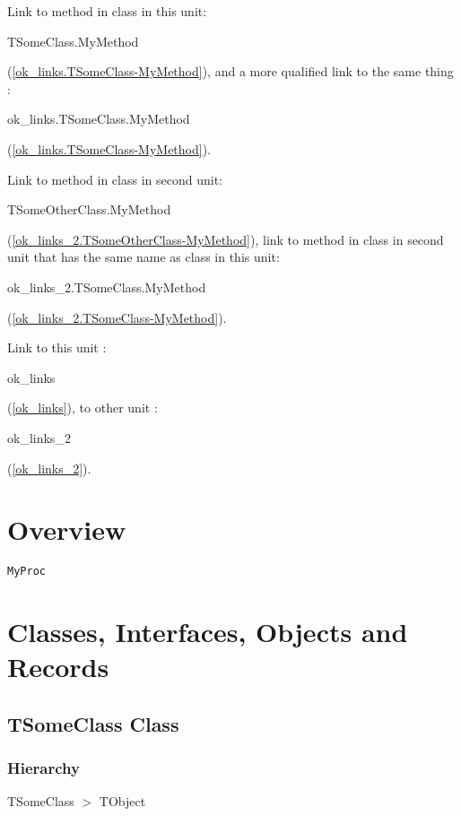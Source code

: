 \documentclass{report}
\begin{document}
Link to method in class in this unit: \begin{ttfamily}TSomeClass.MyMethod\end{ttfamily}(\ref{ok_links.TSomeClass-MyMethod}), and a more qualified link to the same thing : \begin{ttfamily}ok{\_}links.TSomeClass.MyMethod\end{ttfamily}(\ref{ok_links.TSomeClass-MyMethod}).

Link to method in class in second unit: \begin{ttfamily}TSomeOtherClass.MyMethod\end{ttfamily}(\ref{ok_links_2.TSomeOtherClass-MyMethod}), link to method in class in second unit that has the same name as class in this unit: \begin{ttfamily}ok{\_}links{\_}2.TSomeClass.MyMethod\end{ttfamily}(\ref{ok_links_2.TSomeClass-MyMethod}).

Link to this unit : \begin{ttfamily}ok{\_}links\end{ttfamily}(\ref{ok_links}), to other unit : \begin{ttfamily}ok{\_}links{\_}2\end{ttfamily}(\ref{ok_links_2}).
\section{Overview}
\begin{description}
\item[\texttt{\begin{ttfamily}TSomeClass\end{ttfamily} Class}]
\end{description}
\begin{description}
\item[\texttt{MyProc}]
\end{description}
\section{Classes, Interfaces, Objects and Records}
\subsection*{TSomeClass Class}
\subsubsection*{\large{\textbf{Hierarchy}}\normalsize\hspace{1ex}\hfill}
TSomeClass {$>$} TObject
\end{document}
